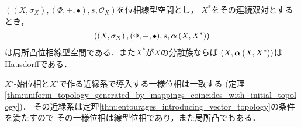 	\begin{screen}
		\begin{thm}[弱位相は局所凸]
			$\left((X,\sigma_X),(\Phi,+,\bullet),s,\mathscr{O}_X\right)$を位相線型空間とし，
			$X^*$をその連続双対とするとき，
			\begin{align}
				\left(\left(X,\sigma_X\right),(\Phi,+,\bullet),s,{\boldsymbol \alpha} \left(X,X^*\right)\right)
			\end{align}
			は局所凸位相線型空間である．また$X^*$が$X$の分離族ならば
			$\left(X,{\boldsymbol \alpha} \left(X,X^*\right)\right)$はHausdorffである．
		\end{thm}
	\end{screen}
	
	\begin{sketch}
		$X'$-始位相と$X'$で作る近縁系で導入する一様位相は一致する
		(定理\ref{thm:uniform_topology_generated_by_mappings_coincides_with_initial_topology})．
		その近縁系は定理\ref{thm:entourages_introducing_vector_topology}の条件を満たすので
		その一様位相は線型位相であり，また局所凸でもある．
		\QED
	\end{sketch}